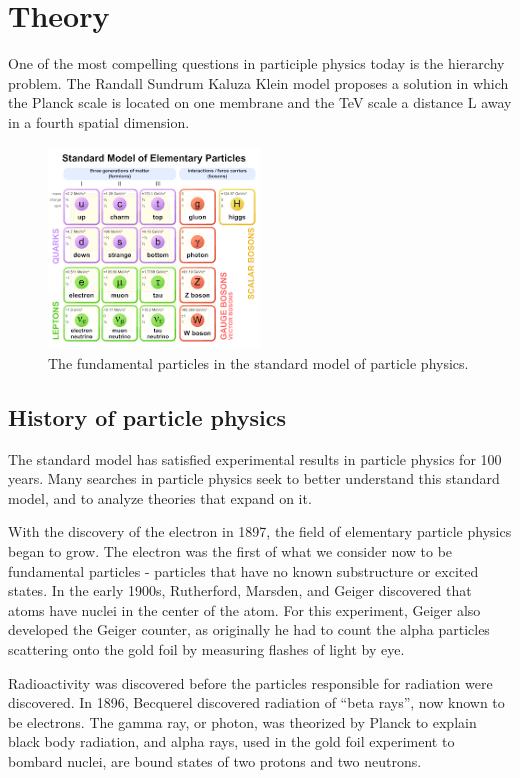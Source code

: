 \chapter{Theory}\label{chap:cms}


One of the most compelling questions in participle physics today is the hierarchy problem. The Randall Sundrum Kaluza Klein model proposes a solution in which the Planck scale is located on one membrane and the TeV scale a distance L away in a fourth spatial dimension. 

\begin{figure}[h]
	\centering
	\includegraphics[width=0.5\textwidth]{figures/sm_blocks.png}
	\caption{The fundamental particles in the standard model of particle physics.}
	\label{fig:sm}
\end{figure}
\clearpage

\section{History of particle physics}
The standard model has satisfied experimental results in particle physics for 100 years. Many searches in particle physics seek to better understand this standard model, and to analyze theories that expand on it.

With the discovery of the electron in 1897, the field of elementary particle physics began to grow. The electron was the first of what we consider now to be fundamental particles - particles that have no known substructure or excited states. In the early 1900s, Rutherford, Marsden, and Geiger discovered that atoms have nuclei in the center of the atom. For this experiment, Geiger also developed the Geiger counter, as originally he had to count the alpha particles scattering onto the gold foil by measuring flashes of light by eye.

Radioactivity was discovered before the particles responsible for radiation were discovered. In 1896, Becquerel discovered radiation of “beta rays”, now known to be electrons. The gamma ray, or photon, was theorized by Planck to explain black body radiation, and alpha rays, used in the gold foil experiment to bombard nuclei, are bound states of two protons and two neutrons. 

